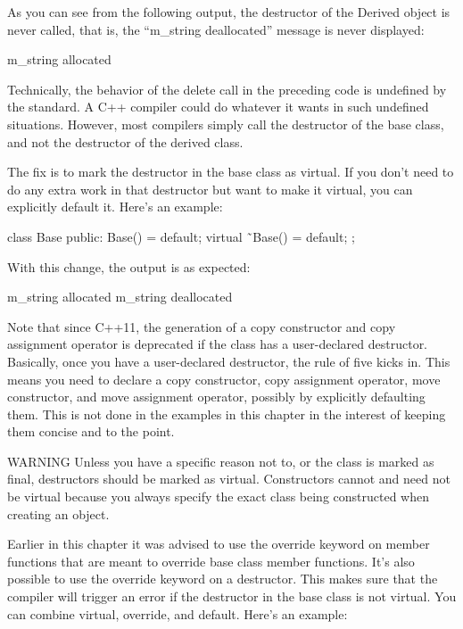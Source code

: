 As you can see from the following output, the destructor of the Derived object is never called, that is, the “m\_string deallocated” message is never displayed:

\begin{cpp}
m_string allocated
\end{cpp}

Technically, the behavior of the delete call in the preceding code is undefined by the standard. A C++ compiler could do whatever it wants in such undefined situations. However, most compilers simply call the destructor of the base class, and not the destructor of the derived class.

The fix is to mark the destructor in the base class as virtual. If you don’t need to do any extra work in that destructor but want to make it virtual, you can explicitly default it. Here’s an example:

\begin{cpp}
class Base
{
    public:
        Base() = default;
        virtual ˜Base() = default;
};
\end{cpp}

With this change, the output is as expected:

\begin{shell}
m_string allocated
m_string deallocated
\end{shell}

Note that since C++11, the generation of a copy constructor and copy assignment operator is deprecated if the class has a user-declared destructor. Basically, once you have a user-declared destructor, the rule of five kicks in. This means you need to declare a copy constructor, copy assignment operator, move constructor, and move assignment operator, possibly by explicitly defaulting them. This is not done in the examples in this chapter in the interest of keeping them concise and to the point.

\begin{myWarning}{WARNING}
Unless you have a specific reason not to, or the class is marked as final, destructors should be marked as virtual. Constructors cannot and need not be virtual because you always specify the exact class being constructed when creating an object.
\end{myWarning}

Earlier in this chapter it was advised to use the override keyword on member functions that are meant to override base class member functions. It’s also possible to use the override keyword on a destructor. This makes sure that the compiler will trigger an error if the destructor in the base class is not virtual. You can combine virtual, override, and default. Here’s an example:

